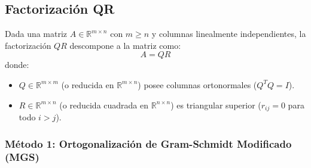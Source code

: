 \documentclass[11pt,a4paper]{article}
\begin{document}
\subsection*{Factorización QR}

Dada una matriz $A \in \mathbb{R}^{m \times n}$ con $m \ge n$ y columnas linealmente independientes, la factorización $QR$ descompone a la matriz como:
\[
A = Q R
\]
donde:
\begin{itemize}
    \item $Q \in \mathbb{R}^{m \times m}$ (o reducida en $\mathbb{R}^{m \times n}$) posee columnas ortonormales ($Q^T Q = I$).
    \item $R \in \mathbb{R}^{m \times n}$ (o reducida cuadrada en $\mathbb{R}^{n \times n}$) es triangular superior ($r_{ij} = 0$ para todo $i > j$).
\end{itemize}

\subsubsection*{Método 1: Ortogonalización de Gram-Schmidt Modificado (MGS)}
\end{document}
